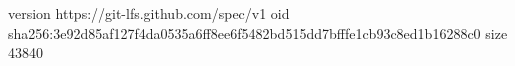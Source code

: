 version https://git-lfs.github.com/spec/v1
oid sha256:3e92d85af127f4da0535a6ff8ee6f5482bd515dd7bfffe1cb93c8ed1b16288c0
size 43840
